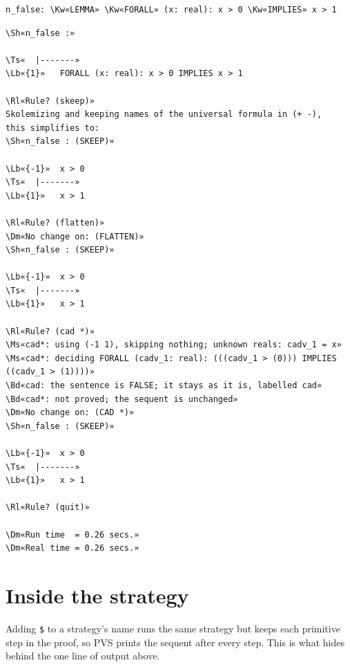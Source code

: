 \documentclass[11pt]{article}
\newcommand\Rl[1]{\textcolor{accent}{\textbf{#1}}}
\newcommand\Ms[1]{\textcolor{moss}{\textbf{#1}}}
\newcommand\Bd[1]{\textcolor{warn}{\textbf{#1}}}
\newcommand\Dm[1]{\textcolor{muted}{#1}}
\newcommand\Lb[1]{\textcolor{muted}{#1}}
\newcommand\Ts[1]{\textcolor{muted}{#1}}
\newcommand\Sh[1]{\textcolor{accent}{#1}}
\newcommand\Kw[1]{\textcolor{accent}{\textbf{#1}}}
\begin{document}
\begin{Verbatim}[commandchars=\\«», fontsize=\small]
  n_false: \Kw«LEMMA» \Kw«FORALL» (x: real): x > 0 \Kw«IMPLIES» x > 1
\end{Verbatim}
\begin{termbox}
\begin{Verbatim}[commandchars=\\«»]
\Sh«n_false :»

\Ts«  |-------»
\Lb«{1}»   FORALL (x: real): x > 0 IMPLIES x > 1

\Rl«Rule? (skeep)»
Skolemizing and keeping names of the universal formula in (+ -),
this simplifies to:
\Sh«n_false : (SKEEP)»

\Lb«{-1}»  x > 0
\Ts«  |-------»
\Lb«{1}»   x > 1

\Rl«Rule? (flatten)»
\Dm«No change on: (FLATTEN)»
\Sh«n_false : (SKEEP)»

\Lb«{-1}»  x > 0
\Ts«  |-------»
\Lb«{1}»   x > 1

\Rl«Rule? (cad *)»
\Ms«cad*: using (-1 1), skipping nothing; unknown reals: cadv_1 = x»
\Ms«cad*: deciding FORALL (cadv_1: real): (((cadv_1 > (0))) IMPLIES ((cadv_1 > (1))))»
\Bd«cad: the sentence is FALSE; it stays as it is, labelled cad»
\Bd«cad*: not proved; the sequent is unchanged»
\Dm«No change on: (CAD *)»
\Sh«n_false : (SKEEP)»

\Lb«{-1}»  x > 0
\Ts«  |-------»
\Lb«{1}»   x > 1

\Rl«Rule? (quit)»

\Dm«Run time  = 0.26 secs.»
\Dm«Real time = 0.26 secs.»
\end{Verbatim}
\end{termbox}

\section{Inside the strategy}\label{sec:inside}
Adding \texttt{\$} to a strategy's name runs the same strategy but keeps each primitive step in the proof,
so PVS prints the sequent after every step. This is what hides behind the one line of output above.
\end{document}
